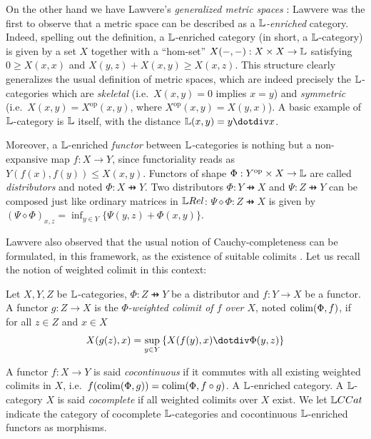 On the other hand we have Lawvere's \emph{generalized metric spaces}  \cite{Lawvere1973, Hofmann2014, Stubbe2014}:
Lawvere was the first to observe that a metric space can be described as a \emph{$\mathbb{L}$-enriched} category. Indeed, spelling out the definition, a $\mathbb{L}$-enriched category (in short, a $\mathbb{L}$-category) is given by a set $X$ together with a ``hom-set'' $X(-,-):X\times X\to \mathbb{L}$ satisfying 
$0  \geq X(x,x)$ and $X(y,z)+X(x,y)\geq  X(x,z)$. 
This structure clearly generalizes the usual definition of metric spaces, which are indeed precisely the  
$\mathbb{L}$-categories which are \emph{skeletal} (i.e.~$X(x,y)=0$ implies $x=y$) and \emph{symmetric} (i.e.~$X(x,y)=X^{\mathrm{op}}(x,y)$, where $X^{\mathrm{op}}(x,y)=X(y,x)$).
A basic example of $\mathbb{L}$-category is $\mathbb{L}$ itself, with the distance $\Lawv(x,y)=y \menus x$. 

Moreover, a $\mathbb{L}$-enriched \emph{functor} between $\mathbb{L}$-categories is nothing but a non-expansive map $f:X\to Y$, since functoriality reads as $Y(f(x),f(y))\leq X(x,y)$.
Functors of shape $\Phi:  Y^{\mathrm{op}}\times X\to \mathbb{L}$ are called \emph{distributors} and noted $\Phi: X \pfun Y$. Two distributors $\Phi: Y\pfun X$ and $\Psi: Z\pfun Y$ can be composed just like 
ordinary matrices in $\LREL$: $\Psi\diamond \Phi : Z\pfun X$ is given by
$(\Psi\diamond \Phi)_{x,z}=\inf_{y\in Y}\{\Psi(y,z)+\Phi(x,y)\}$. 


Lawvere also observed that the usual notion of Cauchy-completeness can be formulated, in this framework, as the existence of suitable colimits \cite{Lawvere1973}. Let us recall the notion of weighted colimit in this context:
 
\begin{definition}
Let $X,Y,Z$ be $\mathbb{L}$-categories,
$\Phi: Z\pfun Y$ be a distributor and  $f:Y\to X$ be a functor.
A functor $g:Z\to X$ is the \emph{$\Phi$-weighted colimit of $f$ over $X$}, noted $\mathrm{colim}(\Phi,f)$, if for all $z\in Z$ and $x\in X$
\begin{align*}
X(g(z),x)= \sup_{y\in Y}\left\{X(f(y),x)\menus \Phi(y,z)\right\}
\end{align*} 

\end{definition}


A functor $f:X\to Y$ is said \emph{cocontinuous} if it commutes with all existing weighted colimits in $X$, i.e.~$f(\mathrm{colim}(\Phi,g))=\mathrm{colim}(\Phi,f\circ g)$. A $\mathbb{L}$-enriched category.
A $\mathbb{L}$-category $X$ is said \emph{cocomplete} if all weighted colimits over $X$ exist. 
We let $\GMet$ indicate the category of cocomplete $\mathbb{L}$-categories and cocontinuous $\mathbb{L}$-enriched functors as morphisms. 


